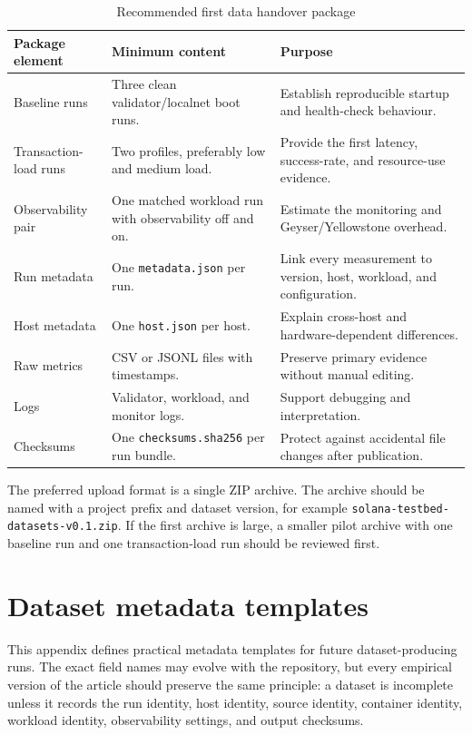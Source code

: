 \documentclass[11pt,a4paper]{article}
\begin{document}
\begin{table}[H]
\centering
\caption{Recommended first data handover package}
\label{tab:first-data-handover}
\begin{tabularx}{\textwidth}{L{3.2cm}Y Y}
\toprule
\textbf{Package element} & \textbf{Minimum content} & \textbf{Purpose} \\
\midrule
Baseline runs & Three clean validator/localnet boot runs. & Establish reproducible startup and health-check behaviour. \\
Transaction-load runs & Two profiles, preferably low and medium load. & Provide the first latency, success-rate, and resource-use evidence. \\
Observability pair & One matched workload run with observability off and on. & Estimate the monitoring and Geyser/Yellowstone overhead. \\
Run metadata & One \texttt{metadata.json} per run. & Link every measurement to version, host, workload, and configuration. \\
Host metadata & One \texttt{host.json} per host. & Explain cross-host and hardware-dependent differences. \\
Raw metrics & CSV or JSONL files with timestamps. & Preserve primary evidence without manual editing. \\
Logs & Validator, workload, and monitor logs. & Support debugging and interpretation. \\
Checksums & One \texttt{checksums.sha256} per run bundle. & Protect against accidental file changes after publication. \\
\bottomrule
\end{tabularx}
\end{table}

The preferred upload format is a single ZIP archive. The archive should be named with a project prefix and dataset version, for example \texttt{solana-testbed-datasets-v0.1.zip}. If the first archive is large, a smaller pilot archive with one baseline run and one transaction-load run should be reviewed first.

\section{Dataset metadata templates}
\label{app:metadata-templates}

This appendix defines practical metadata templates for future dataset-producing runs. The exact field names may evolve with the repository, but every empirical version of the article should preserve the same principle: a dataset is incomplete unless it records the run identity, host identity, source identity, container identity, workload identity, observability settings, and output checksums.
\end{document}
